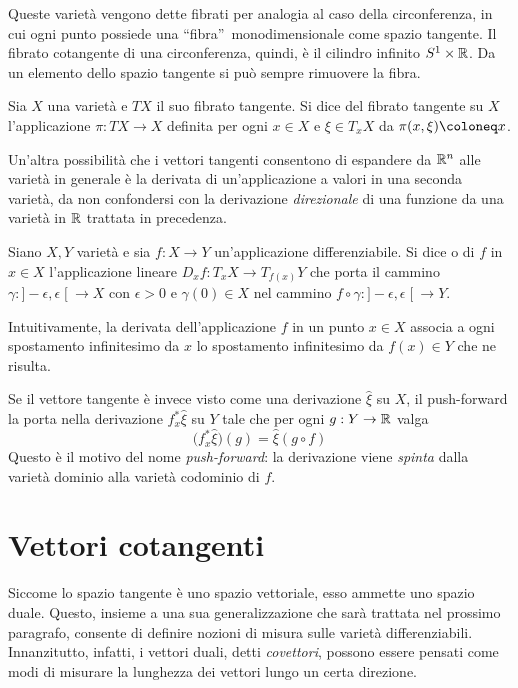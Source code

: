 Queste varietà vengono dette fibrati per analogia al caso della circonferenza, in cui ogni punto possiede una \textquotedblleft fibra\textquotedblright\ monodimensionale come spazio tangente. Il fibrato cotangente di una circonferenza, quindi, è il cilindro infinito $S^1 \times \mathbb{R}$. Da un elemento dello spazio tangente si può sempre rimuovere la fibra.
\begin{definition}
  Sia $X$ una varietà e $T X$ il suo fibrato tangente. Si dice  del fibrato tangente su $X$ l'applicazione $\pi: TX \to X$ definita per ogni $x \in X$ e $\xi \in T_x X$ da $\pi(x,\xi) \defeq x$.
\end{definition}

Un'altra possibilità che i vettori tangenti consentono di espandere da $\mathbb{R}^{n}$ alle varietà in generale è la derivata di un'applicazione a valori in una seconda varietà, da non confondersi con la derivazione \emph{direzionale} di una funzione da una varietà in $\mathbb{R}$ trattata in precedenza.
\begin{definition}
  Siano $X,Y$ varietà e sia $f:X\to Y$ un'applicazione differenziabile. Si dice  o  di $f$ in $x \in X$ l'applicazione lineare $D_x f:T_x X \to T_{f(x)}Y$ che porta il cammino $\gamma: ]-\epsilon, \epsilon\;[\ \to X$ con $\epsilon>0$ e $\gamma(0) \in X$ nel cammino $f \circ \gamma:]-\epsilon, \epsilon\;[\ \to Y$.
\end{definition}
\begin{remark}
  Intuitivamente, la derivata dell'applicazione $f$ in un punto $x \in X$ associa a ogni spostamento infinitesimo da $x$ lo spostamento infinitesimo da $f(x) \in Y$ che ne risulta.
\end{remark}
\begin{remark}
  Se il vettore tangente è invece visto come una derivazione $\hat{\xi}$ su $X$, il push-forward la porta nella derivazione $f^*_x \hat{\xi}$ su $Y$ tale che per ogni $g:Y\to \mathbb{R}$ valga
  \begin{equation}
    \big(f^*_x \hat{\xi}\big)(g) = \hat{\xi} (g \circ f) 
  \end{equation} 
  Questo è il motivo del nome \emph{push-forward}: la derivazione viene \emph{spinta} dalla varietà dominio alla varietà codominio di $f$. 
\end{remark}

\section{Vettori cotangenti}
Siccome lo spazio tangente è uno spazio vettoriale, esso ammette uno spazio duale. Questo, insieme a una sua generalizzazione che sarà trattata nel prossimo paragrafo, consente di definire nozioni di misura sulle varietà differenziabili. Innanzitutto, infatti, i vettori duali, detti \emph{covettori}, possono essere pensati come modi di misurare la lunghezza dei vettori lungo un certa direzione.

